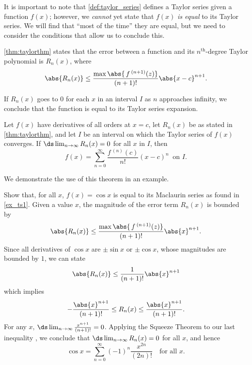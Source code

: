 It is important to note that \autoref{def:taylor_series} defines a Taylor series given a function $f(x)$; however, we \emph{cannot} yet state that $f(x)$ \emph{is equal} to its Taylor series. We will find that ``most of the time'' they are equal, but we need to consider the conditions that allow us to conclude this.

\autoref{thm:taylorthm} states that the error between a function and its $n^\text{th}$-degree Taylor polynomial is $R_n(x)$, where
\[\abs{R_n(x)}\leq \frac{\max\abs{\,f\,^{(n+1)}(z)}}{(n+1)!}\abs{x-c}^{n+1}.\]

If $R_n(x)$ goes to 0 for each $x$ in an interval $I$ as $n$ approaches infinity, we conclude that the function is equal to its Taylor series expansion.

\begin{theorem}\label{thm:function_series_equality}%
Let $f(x)$ have derivatives of all orders at $x=c$, let $R_n(x)$ be as stated in \autoref{thm:taylorthm}, and let $I$ be an interval on which the Taylor series of $f(x)$ converges. 
If $\ds\lim_{n\to\infty} R_n(x) = 0$ for all $x$ in $I$, then 
\[f(x) = \sum_{n=0}^\infty \frac{f\,^{(n)}(c)}{n!}(x-c)^n\ \text{ on $I$.}\]
\end{theorem}

We demonstrate the use of this theorem in an example.

\begin{example}\label{ex_ts3}%
Show that, for all $x$, $f(x) = \cos x$ is equal to its Maclaurin series as found in \autoref{ex_ts1}.
\solution
Given a value $x$, the magnitude of the error term $R_n(x)$ is bounded by
\[\abs{R_n(x)}\leq \frac{\max\abs{\,f\,^{(n+1)}(z)}}{(n+1)!}\abs{x}^{n+1}.\]
Since all derivatives of $\cos x$ are $\pm \sin x$ or $\pm\cos x$, whose magnitudes are bounded by $1$, we can state
\[\abs{R_n(x)}\leq \frac{1}{(n+1)!}\abs{x}^{n+1}\]
which implies
\begin{equation*}
 -\frac{\abs{x}^{n+1}}{(n+1)!} \leq R_n(x) \leq\frac{\abs{x}^{n+1}}{(n+1)!}.%
\end{equation*}
For any $x$, $\ds\lim_{n\to\infty} \frac{x^{n+1}}{(n+1)!} = 0$. Applying the Squeeze Theorem to our last inequality%
, we conclude that $\ds \lim_{n\to\infty} R_n(x) = 0$ for all $x$, and hence
\[\cos x = \sum_{n=0}^\infty (-1)^{n}\frac{x^{2n}}{(2n)!}\quad \text{for all $x$}.\]
\end{example}

